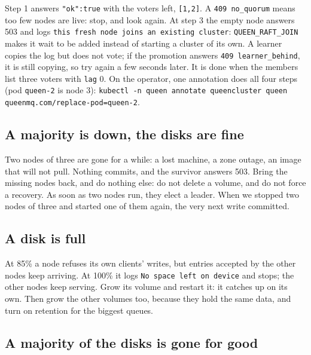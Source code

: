 Step 1 answers \texttt{"ok":true} with the voters left, \texttt{[1,2]}. A \texttt{409 no\_quorum}
means too few nodes are live: stop, and look again. At step 3 the empty node answers 503 and logs
\texttt{this fresh node joins an existing cluster}: \texttt{QUEEN\_RAFT\_JOIN} makes it wait to be
added instead of starting a cluster of its own. A learner copies the log but does not vote; if the
promotion answers \texttt{409 learner\_behind}, it is still copying, so try again a few seconds
later. It is done when the members list three voters with \texttt{lag} 0. On the operator, one
annotation does all four steps (pod \texttt{queen-2} is node 3):
\texttt{kubectl -n queen annotate queencluster queen queenmq.com/replace-pod=queen-2}.



\subsection{A majority is down, the disks are fine}

Two nodes of three are gone for a while: a lost machine, a zone outage, an image that will not
pull. Nothing commits, and the survivor answers 503. Bring the missing nodes back, and do nothing
else: do not delete a volume, and do not force a recovery. As soon as two nodes run, they elect a
leader. When we stopped two nodes of three and started one of them again, the very next write
committed.

\subsection{A disk is full}

At 85\% a node refuses its own clients' writes, but entries accepted by the other nodes keep
arriving. At 100\% it logs \texttt{No space left on device} and stops; the other nodes keep
serving. Grow its volume and restart it: it catches up on its own. Then grow the other volumes too,
because they hold the same data, and turn on retention for the biggest queues.

\subsection{A majority of the disks is gone for good}

